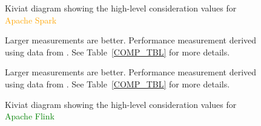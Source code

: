   \begin{figure}[p]
      \begin{floatrow}
          \ffigbox
              {
                  \caption{Kiviat diagram showing the high-level consideration values for \textcolor{orange}{Apache Spark}}
                  \label{COMP_KIV_SPARK}
              }
              {

                  Larger measurements are better. Performance measurement derived using data from \citeauthor{VEIGA:EVALUATION:2015} \cite{VEIGA:EVALUATION:2015}. See Table~\ref{COMP_TBL} for more details.
              }
          \ffigbox
              {
                  \caption{Kiviat diagram showing the high-level consideration values for \textcolor{Green}{Apache Flink}}
                  \label{COMP_KIV_FLINK}
              }
              {

                  Larger measurements are better. Performance measurement derived using data from \citeauthor{VEIGA:EVALUATION:2015} \cite{VEIGA:EVALUATION:2015}. See Table~\ref{COMP_TBL} for more details.
              }
      \end{floatrow}
  \end{figure}


